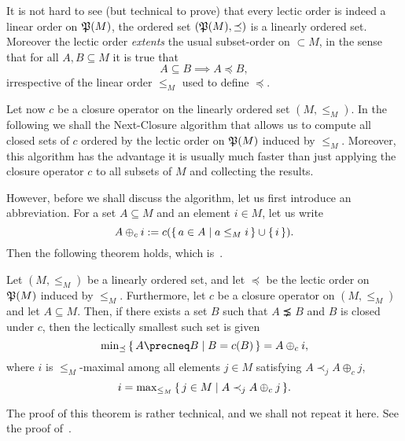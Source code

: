 It is not hard to see (but technical to prove) that every lectic order is indeed a linear
order on ${\mathfrak{P}(M)}$, \ie the ordered set $({\mathfrak{P}(M)}, \preceq)$ is a linearly ordered
set.  Moreover the lectic order \emph{extents} the usual subset-order on $\subset{M}$, in
the sense that for all $A, B \subseteq M$ it is true that
\begin{equation*}
  A \subseteq B \implies A \preceq B,
\end{equation*}
irrespective of the linear order $\leq_M$ used to define $\preceq$.

Let now $c$ be a closure operator on the linearly ordered set $(M, \leq_M)$.  In the
following we shall the Next-Closure algorithm\cite{fca-book,fca:Ganter:1984} that allows
us to compute all closed sets of $c$ ordered by the lectic order on ${\mathfrak{P}(M)}$ induced
by $\leq_M$.  Moreover, this algorithm has the advantage it is usually much faster than
just applying the closure operator $c$ to all subsets of $M$ and collecting the results.

However, before we shall discuss the algorithm, let us first introduce an abbreviation.
For a set $A \subseteq M$ and an element $i \in M$, let us write
\begin{equation*}
  A \oplus_c i := c({\{\, a \in A \mid a \leq_M i \,\}} \cup {\ensuremath{\{\,i\,\}}}).
\end{equation*}
Then the following theorem holds, which is~\cite[Theorem 5]{fca-book}.

\begin{Theorem}
  \label{thm:next-closure}
  Let $(M, \leq_M)$ be a linearly ordered set, and let $\preceq$ be the lectic order on
  ${\mathfrak{P}(M)}$ induced by $\leq_M$.  Furthermore, let $c$ be a closure operator on $(M,
  \leq_M)$ and let $A \subseteq M$.  Then, if there exists a set $B$ such that $A \precneq
  B$ and $B$ is closed under $c$, then the lectically smallest such set is given
  \begin{equation*}
    \min\nolimits_{\preceq}\set{ A \precneq B \mid B = c(B) } = A \oplus_c i,
  \end{equation*}
  where $i$ is $\leq_M$-maximal among all elements $j \in M$ satisfying $A \prec_j A
  \oplus_c j$, \ie
  \begin{equation*}
    i = \max\nolimits_{\leq_M} {\{\, j \in M \mid A \prec_j A \oplus_c j \,\}}.
  \end{equation*}
\end{Theorem}

The proof of this theorem is rather technical, and we shall not repeat it here.  See the
proof of~\cite[Theorem 5]{fca-book}.

